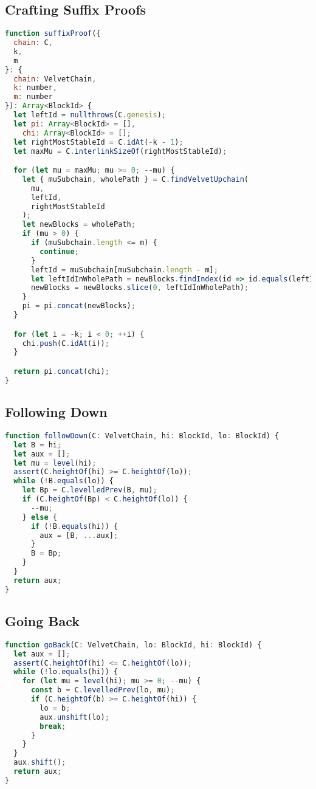 \subsection{Crafting Suffix Proofs}
\begin{lstlisting}[language=Javascript]
function suffixProof({
  chain: C,
  k,
  m
}: {
  chain: VelvetChain,
  k: number,
  m: number
}): Array<BlockId> {
  let leftId = nullthrows(C.genesis);
  let pi: Array<BlockId> = [],
    chi: Array<BlockId> = [];
  let rightMostStableId = C.idAt(-k - 1);
  let maxMu = C.interlinkSizeOf(rightMostStableId);

  for (let mu = maxMu; mu >= 0; --mu) {
    let { muSubchain, wholePath } = C.findVelvetUpchain(
      mu,
      leftId,
      rightMostStableId
    );
    let newBlocks = wholePath;
    if (mu > 0) {
      if (muSubchain.length <= m) {
        continue;
      }
      leftId = muSubchain[muSubchain.length - m];
      let leftIdInWholePath = newBlocks.findIndex(id => id.equals(leftId));
      newBlocks = newBlocks.slice(0, leftIdInWholePath);
    }
    pi = pi.concat(newBlocks);
  }

  for (let i = -k; i < 0; ++i) {
    chi.push(C.idAt(i));
  }

  return pi.concat(chi);
}
\end{lstlisting}

\subsection{Following Down}
\begin{lstlisting}[language=Javascript]
function followDown(C: VelvetChain, hi: BlockId, lo: BlockId) {
  let B = hi;
  let aux = [];
  let mu = level(hi);
  assert(C.heightOf(hi) >= C.heightOf(lo));
  while (!B.equals(lo)) {
    let Bp = C.levelledPrev(B, mu);
    if (C.heightOf(Bp) < C.heightOf(lo)) {
      --mu;
    } else {
      if (!B.equals(hi)) {
        aux = [B, ...aux];
      }
      B = Bp;
    }
  }
  return aux;
}
\end{lstlisting}

\subsection{Going Back}
\begin{lstlisting}[language=Javascript]
function goBack(C: VelvetChain, lo: BlockId, hi: BlockId) {
  let aux = [];
  assert(C.heightOf(hi) <= C.heightOf(lo));
  while (!lo.equals(hi)) {
    for (let mu = level(hi); mu >= 0; --mu) {
      const b = C.levelledPrev(lo, mu);
      if (C.heightOf(b) >= C.heightOf(hi)) {
        lo = b;
        aux.unshift(lo);
        break;
      }
    }
  }
  aux.shift();
  return aux;
}
\end{lstlisting}


